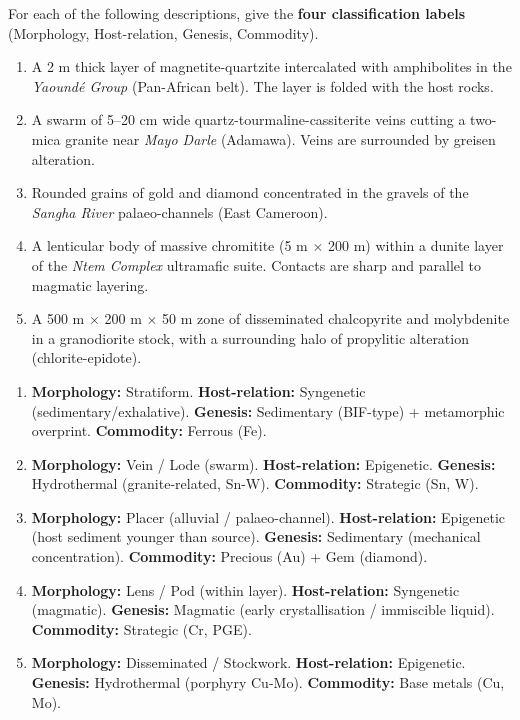 \documentclass[11pt]{article}
\begin{document}
\begin{exercice}
For each of the following descriptions, give the \textbf{four classification labels} (Morphology, Host-relation, Genesis, Commodity).

\begin{enumerate}
  \item A 2 m thick layer of magnetite-quartzite intercalated with amphibolites in the \emph{Yaoundé Group} (Pan-African belt). The layer is folded with the host rocks.
  \item A swarm of 5--20 cm wide quartz-tourmaline-cassiterite veins cutting a two-mica granite near \emph{Mayo Darle} (Adamawa). Veins are surrounded by greisen alteration.
  \item Rounded grains of gold and diamond concentrated in the gravels of the \emph{Sangha River} palaeo-channels (East Cameroon).
  \item A lenticular body of massive chromitite (5 m $\times$ 200 m) within a dunite layer of the \emph{Ntem Complex} ultramafic suite. Contacts are sharp and parallel to magmatic layering.
  \item A 500 m $\times$ 200 m $\times$ 50 m zone of disseminated chalcopyrite and molybdenite in a granodiorite stock, with a surrounding halo of propylitic alteration (chlorite-epidote).
\end{enumerate}
\end{exercice}

\begin{corrige}[Exercise 1]
\begin{enumerate}
  \item \textbf{Morphology:} Stratiform. \textbf{Host-relation:} Syngenetic (sedimentary/exhalative). \textbf{Genesis:} Sedimentary (BIF-type) + metamorphic overprint. \textbf{Commodity:} Ferrous (Fe).
  \item \textbf{Morphology:} Vein / Lode (swarm). \textbf{Host-relation:} Epigenetic. \textbf{Genesis:} Hydrothermal (granite-related, Sn-W). \textbf{Commodity:} Strategic (Sn, W).
  \item \textbf{Morphology:} Placer (alluvial / palaeo-channel). \textbf{Host-relation:} Epigenetic (host sediment younger than source). \textbf{Genesis:} Sedimentary (mechanical concentration). \textbf{Commodity:} Precious (Au) + Gem (diamond).
  \item \textbf{Morphology:} Lens / Pod (within layer). \textbf{Host-relation:} Syngenetic (magmatic). \textbf{Genesis:} Magmatic (early crystallisation / immiscible liquid). \textbf{Commodity:} Strategic (Cr, PGE).
  \item \textbf{Morphology:} Disseminated / Stockwork. \textbf{Host-relation:} Epigenetic. \textbf{Genesis:} Hydrothermal (porphyry Cu-Mo). \textbf{Commodity:} Base metals (Cu, Mo).
\end{enumerate}
\end{corrige}
\end{document}
